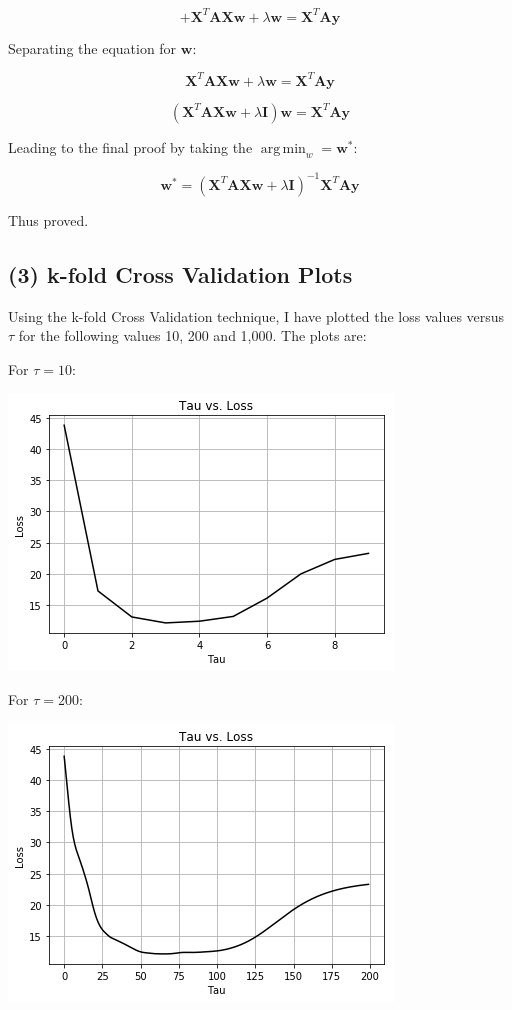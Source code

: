 \documentclass[10pt]{article}
\begin{document}
\[
+ \textbf{X}^T\textbf{A}\textbf{X}\textbf{w}
+
\lambda\textbf{w}
= \textbf{X}^T\textbf{A}\textbf{y}
\]

Separating the equation for $\textbf{w}$:

\[
\textbf{X}^T\textbf{A}\textbf{X}\textbf{w}
+
\lambda\textbf{w}
= \textbf{X}^T\textbf{A}\textbf{y}
\]

\[
(\textbf{X}^T\textbf{A}\textbf{X}\textbf{w}
+\lambda\textbf{I})
\textbf{w}
= \textbf{X}^T\textbf{A}\textbf{y}
\]

Leading to the final proof by taking the $\operatorname{arg\,min}_w = \textbf{w}^*$:

\[
\textbf{w}^{*}
= (\textbf{X}^T\textbf{A}\textbf{X}\textbf{w}
+\lambda\textbf{I})^{-1}\textbf{X}^T\textbf{A}\textbf{y}
\]

Thus proved.

\pagebreak

\subsection{(3) k-fold Cross Validation Plots}
\label{sec:kfold}

Using the k-fold Cross Validation technique, I have plotted the loss values versus $\tau$ for the following values 10, 200 and 1,000. The plots are:

For $\tau = 10$:

\includegraphics[scale=1.0]{10TauMean.png}

For $\tau = 200$:

\includegraphics[scale=1.0]{200TauMean.png}
\end{document}
